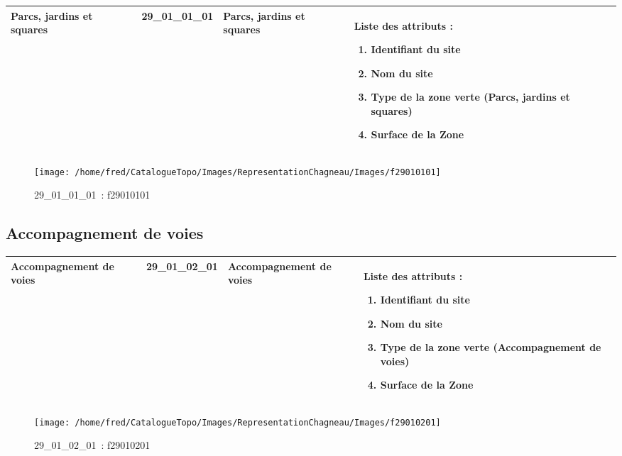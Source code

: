 \documentclass[12pt,titlepage]{book}
\begin{document}
\renewcommand{\arraystretch}{1.2}
\begin{supertabular}{|p{10cm}|c|p{13cm}|p{12cm}|}
 Parcs, jardins et squares & 29\_01\_01\_01 & Parcs, jardins et squares & Liste des attributs :
\begin{enumerate}
  \item Identifiant du site  \item Nom du site  \item Type de la zone verte (Parcs, jardins et squares)  \item Surface de la Zone\end{enumerate}
\\
\hline
\end{supertabular}
\begin{figure}[h!]
  \hfill         %
  \begin{minipage}[t]{3cm}
    \begin{center}
      \texttt{[image: /home/fred/CatalogueTopo/Images/RepresentationChagneau/Images/f29010101]}
      \caption[~29\_01\_01\_01]{\small{29\_01\_01\_01~:} \tiny{f29010101}}\label{f29010101}
    \end{center}
  \end{minipage}
\end{figure}


\subsection{Accompagnement de voies}
\noindent
\vspace{\baselineskip}

\renewcommand{\arraystretch}{1.2}
\begin{supertabular}{|p{10cm}|c|p{13cm}|p{12cm}|}
 Accompagnement de voies & 29\_01\_02\_01 & Accompagnement de voies & Liste des attributs :
\begin{enumerate}
  \item Identifiant du site  \item Nom du site  \item Type de la zone verte (Accompagnement de voies)  \item Surface de la Zone\end{enumerate}
\\
\hline
\end{supertabular}
\begin{figure}[h!]
  \hfill         %
  \begin{minipage}[t]{3cm}
    \begin{center}
      \texttt{[image: /home/fred/CatalogueTopo/Images/RepresentationChagneau/Images/f29010201]}
      \caption[~29\_01\_02\_01]{\small{29\_01\_02\_01~:} \tiny{f29010201}}\label{f29010201}
    \end{center}
  \end{minipage}
\end{figure}
\end{document}
